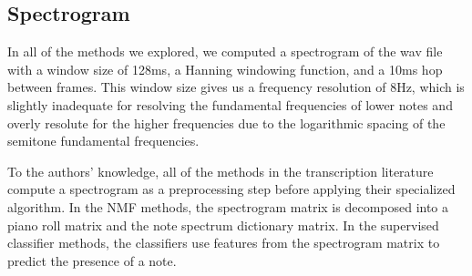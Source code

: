 \documentclass[5p]{elsarticle}
\begin{document}




\subsection{Spectrogram}

In all of the methods we explored, we computed a spectrogram of the wav file with a window size of 128ms, a Hanning windowing function, and a 10ms hop between frames. This window size gives us a frequency resolution of 8Hz, which is slightly inadequate for resolving the fundamental frequencies of lower notes and overly resolute for the higher frequencies due to the logarithmic spacing of the semitone fundamental frequencies. 

To the authors' knowledge, all of the methods in the transcription literature compute a spectrogram as a preprocessing step before applying their specialized algorithm. In the NMF methods, the spectrogram matrix is decomposed into a piano roll matrix and the note spectrum dictionary matrix. In the supervised classifier methods, the classifiers use features from the spectrogram matrix to predict the presence of a note. 
\end{document}
